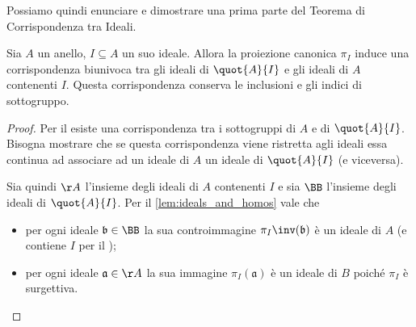 Possiamo quindi enunciare e dimostrare una prima parte del Teorema di Corrispondenza tra Ideali.

\begin{theorem}
    \label{th:ideal_corr}
    Sia $A$ un anello, $I \subseteq A$ un suo ideale. Allora la proiezione canonica $\pi_I$ induce una corrispondenza biunivoca tra gli ideali di $\quot{A}{I}$ e gli ideali di $A$ contenenti $I$. Questa corrispondenza conserva le inclusioni e gli indici di sottogruppo.
\end{theorem}
\begin{proof}
    Per il  esiste una corrispondenza tra i sottogruppi di $A$ e di $\quot{A}{I}$. Bisogna mostrare che se questa corrispondenza viene ristretta agli ideali essa continua ad associare ad un ideale di $A$ un ideale di $\quot{A}{I}$ (e viceversa).

    Sia quindi $\AA$ l'insieme degli ideali di $A$ contenenti $I$ e sia $\BB$ l'insieme degli ideali di $\quot{A}{I}$. Per il \autoref{lem:ideals_and_homos} vale che \begin{itemize}
        \item per ogni ideale $\mathfrak{b} \in \BB$ la sua controimmagine $\pi_I\inv(\mathfrak{b})$ è un ideale di $A$ (e contiene $I$ per il );
        \item per ogni ideale $\mathfrak{a} \in \AA$ la sua immagine $\pi_I(\mathfrak{a})$ è un ideale di $B$ poiché $\pi_I$ è surgettiva. \qedhere
    \end{itemize}
\end{proof}